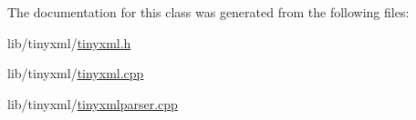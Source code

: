 The documentation for this class was generated from the following files\-:\begin{DoxyCompactItemize}
\item 
lib/tinyxml/\hyperlink{tinyxml_8h}{tinyxml.\-h}\item 
lib/tinyxml/\hyperlink{tinyxml_8cpp}{tinyxml.\-cpp}\item 
lib/tinyxml/\hyperlink{tinyxmlparser_8cpp}{tinyxmlparser.\-cpp}\end{DoxyCompactItemize}
